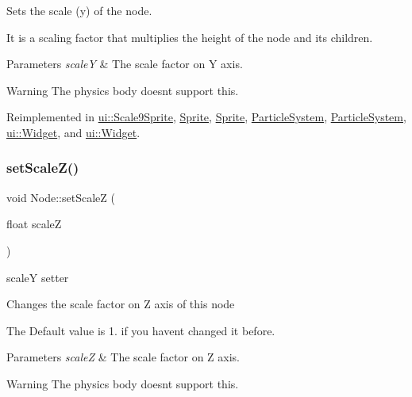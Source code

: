 Sets the scale (y) of the node.

It is a scaling factor that multiplies the height of the node and its children.


\begin{DoxyParams}{Parameters}
{\em scaleY} & The scale factor on Y axis.\\
\hline
\end{DoxyParams}
\begin{DoxyWarning}{Warning}
The physics body doesn\textquotesingle{}t support this. 
\end{DoxyWarning}


Reimplemented in \hyperlink{classui_1_1Scale9Sprite_a7c108e20a3b0b479258447335531bfe2}{ui\+::\+Scale9\+Sprite}, \hyperlink{classSprite_ab7e7db21d5cd13269074fde7195fa3e2}{Sprite}, \hyperlink{classSprite_a167e418b057071cbaf57f75f7c88c9df}{Sprite}, \hyperlink{classParticleSystem_a1e6720f314dfec3f5b7ca02c305ea28e}{Particle\+System}, \hyperlink{classParticleSystem_a3b3ba015dde4abcf804692cacef4f575}{Particle\+System}, \hyperlink{classui_1_1Widget_a8d68ee46f555dc23b8fcec84542eadcc}{ui\+::\+Widget}, and \hyperlink{classui_1_1Widget_acac2f88e6a4fb013377bc981a4a10c57}{ui\+::\+Widget}.

\mbox{\label{classNode_a79518b90226335e0997552687eb7b33f}} 
\subsubsection{\texorpdfstring{set\+Scale\+Z()}{setScaleZ()}\hspace{0.1cm}{\footnotesize\ttfamily [1/2]}}
{\footnotesize\ttfamily void Node\+::set\+ScaleZ (\begin{DoxyParamCaption}\item[{float}]{scaleZ }\end{DoxyParamCaption})\hspace{0.3cm}{\ttfamily [virtual]}}



scaleY setter 

Changes the scale factor on Z axis of this node

The Default value is 1. if you haven\textquotesingle{}t changed it before.


\begin{DoxyParams}{Parameters}
{\em scaleZ} & The scale factor on Z axis.\\
\hline
\end{DoxyParams}
\begin{DoxyWarning}{Warning}
The physics body doesn\textquotesingle{}t support this. 
\end{DoxyWarning}
\mbox{\label{classNode_aeaafb9dc116fdf029f51c7d3e6011a7f}} 
